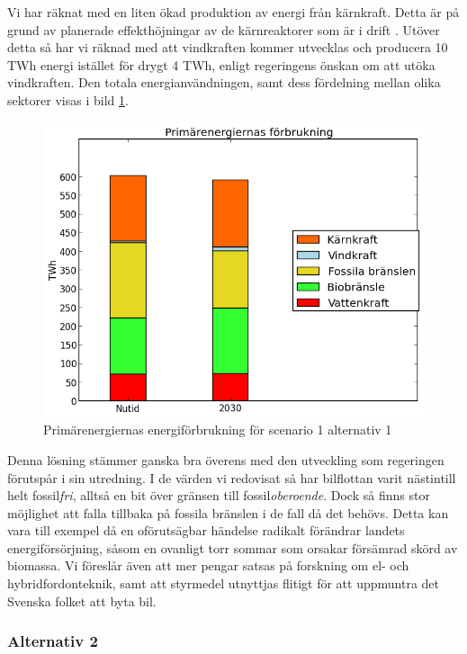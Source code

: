 \documentclass[a4paper,11pt,fleqn, titlepage]{article}
\begin{document}
Vi har räknat med en liten ökad produktion av energi från kärnkraft. Detta
är på grund av planerade effekthöjningar av de kärnreaktorer som är i
drift \cite{energimyndigheten}. Utöver detta så har vi räknad med att
vindkraften kommer utvecklas och producera 10 TWh energi istället för drygt
4 TWh, enligt regeringens önskan om att utöka vindkraften. Den totala
energianvändningen, samt dess fördelning mellan olika sektorer visas
i bild \ref{fig:scen1a1energidiagram}.

\begin{figure}[h!]
       \centering
       \includegraphics[scale=0.7]{scen1a1energidiagram.png}
       \caption{Primärenergiernas energiförbrukning för scenario 1 alternativ 1}
       \label{fig:scen1a1energidiagram}
\end{figure}

Denna lösning stämmer ganska bra överens med den utveckling som regeringen förutspår i sin utredning. I de värden vi redovisat så har bilflottan varit nästintill helt fossil\textit{fri}, alltså en bit över gränsen till fossil\textit{oberoende}. Dock så finns stor möjlighet att falla tillbaka på fossila bränslen i de fall då det behövs. Detta kan vara till exempel då en oförutsägbar händelse radikalt förändrar landets energiförsörjning, såsom en ovanligt torr sommar som orsakar försämrad skörd av biomassa. Vi föreslår även att mer pengar satsas på forskning om el- och hybridfordonteknik, samt att styrmedel utnyttjas flitigt för att uppmuntra det Svenska folket att byta bil.

\subsubsection{Alternativ 2}
\end{document}
